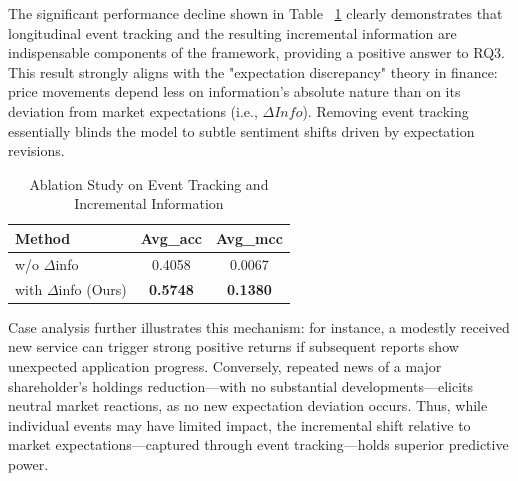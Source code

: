 \documentclass[sigconf, nonacm]{acmart} %
\begin{document}
The significant performance decline shown in Table ~\ref{tab:ablation_tracking} clearly demonstrates that longitudinal event tracking and the resulting incremental information are indispensable components of the framework, providing a positive answer to RQ3. 
This result strongly aligns with the "expectation discrepancy" theory in finance: price movements depend less on information's absolute nature than on its deviation from market expectations (i.e., $\Delta Info$). Removing event tracking essentially blinds the model to subtle sentiment shifts driven by expectation revisions.

\begin{table}[h]
\centering
\small
\caption{Ablation Study on Event Tracking and Incremental Information}
\label{tab:ablation_tracking}
\begin{tabular}{lcc}
\toprule
Method & Avg\_acc & Avg\_mcc \\
\midrule
w/o $\Delta$info & 0.4058 & 0.0067 \\
with $\Delta$info (Ours) & \textbf{0.5748} & \textbf{0.1380} \\
\bottomrule
\end{tabular}
\end{table}
Case analysis further illustrates this mechanism:
for instance, a modestly received new service can trigger strong positive returns if subsequent reports show unexpected application progress.
Conversely, repeated news of a major shareholder's holdings reduction—with no substantial developments—elicits neutral market reactions, as no new expectation deviation occurs.
Thus, while individual events may have limited impact, the incremental shift relative to market expectations—captured through event tracking—holds superior predictive power.
\end{document}
